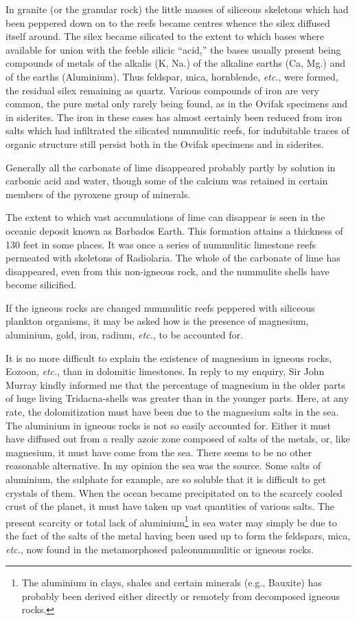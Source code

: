\documentclass[a4paper, 12pt, oneside]{article}
\begin{document}
In granite (or the granular rock) the little masses of siliceous skeletons which had been peppered down on to the reefs became centres whence the silex diffused itself around. The silex became silicated to the extent to which bases where available for union with the feeble silicic ``acid,'' the bases usually present being compounds of metals of the alkalis (K, Na.) of the alkaline earths (Ca, Mg.) and of the earths (Aluminium). Thus feldspar, mica, hornblende, \emph{etc.}, were formed, the residual silex remaining as quartz. Various compounds of iron are very common, the pure metal only rarely being found, as in the Ovifak specimens and in siderites. The iron in these cases has almost certainly been reduced from iron salts which had infiltrated the silicated nummulitic reefs, for indubitable traces of organic structure still persist both in the Ovifak specimens and in siderites.

Generally all the carbonate of lime disappeared probably partly by solution in carbonic acid and water, though some of the calcium was retained in certain members of the pyroxene group of minerals.

The extent to which vast accumulations of lime can disappear is seen in the oceanic deposit known as Barbados Earth. This formation attains a thickness of 130 feet in some places. It was once a series of nummulitic limestone reefs permeated with skeletons of Radiolaria. The whole of the carbonate of lime has disappeared, even from this non-igneous rock, and the nummulite shells have become silicified.

If the igneous rocks are changed nummulitic reefs peppered with siliceous plankton organisms, it may be asked how is the presence of magnesium, aluminium, gold, iron, radium, \emph{etc.}, to be accounted for.

It is no more difficult to explain the existence of magnesium in igneous rocks, Eozoon, \emph{etc.}, than in dolomitic limestones. In reply to my enquiry, Sir John Murray kindly informed me that the percentage of magnesium in the older parts of huge living Tridacna-shells was greater than in the younger parts. Here, at any rate, the dolomitization must have been due to the magnesium salts in the sea. The aluminium in igneous rocks is not so easily accounted for. Either it must have diffused out from a really azoic zone composed of salts of the metals, or, like magnesium, it must have come from the sea. There seems to be no other reasonable alternative. In my opinion the sea was the source. Some salts of aluminium, the sulphate for example, are so soluble that it is difficult to get crystals of them. When the ocean became precipitated on to the scarcely cooled crust of the planet, it must have taken up vast quantities of various salts. The present scarcity or total lack of aluminium\footnote{The aluminium in clays, shales and certain minerals (e.g., Bauxite) has probably been derived either directly or remotely from decomposed igneous rocks.} in sea water may simply be due to the fact of the salts of the metal having been used up to form the feldspars, mica, \emph{etc.}, now found in the metamorphosed paleonummulitic or igneous rocks.
\end{document}
